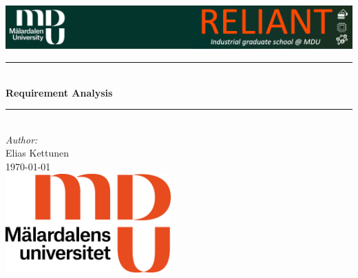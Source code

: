 \documentclass[11pt]{article}
\begin{document}
\begin{titlepage}

\newcommand{\HRule}{\rule{\linewidth}{0.5mm}} %



\begin{center}
\includegraphics[scale=0.38]{Images/reliant-banner.png}\\%
\HRule \\[0.4cm]
{ \huge \bfseries Requirement Analysis}\\[0.4cm] %
\HRule \\[1.5cm]
 
\large\emph{Author:}\\Elias Kettunen\\[1.0cm]


{\large \today}\\[1cm] %

\includegraphics[width=2.5in]{Images/MDU_logotyp1_RGB.jpg}\\%
\end{center}
\end{titlepage}
\pagebreak
\tableofcontents
\pagebreak





\end{document}
